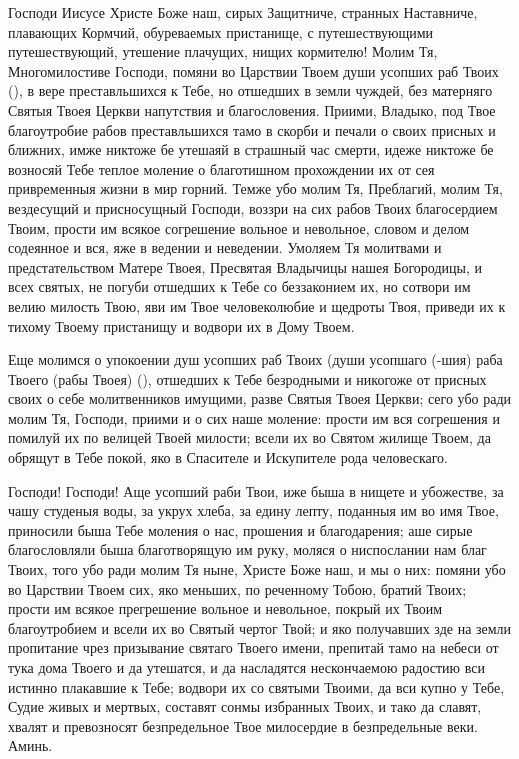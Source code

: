 \mychapterending

\begin{mymulticols}
 

Господи Иисусе Христе Боже наш, сирых Защитниче, странных Наставниче, плавающих Кормчий, обуреваемых пристанище, с путешествующими путешествующий, утешение плачущих, нищих кормителю! Молим Тя, Многомилостиве Господи, помяни во Царствии Твоем души усопших раб Твоих (), в вере преставльшихся к Тебе, но отшедших в земли чуждей, без матерняго Святыя Твоея Церкви напутствия и благословения. Приими, Владыко, под Твое благоутробие рабов преставльшихся тамо в скорби и печали о своих присных и ближних, имже никтоже бе утешаяй в страшный час смерти, идеже никтоже бе возносяй Тебе теплое моление о благотишном прохождении их от сея привременныя жизни в мир горний. Темже убо молим Тя, Преблагий, молим Тя, вездесущий и присносущный Господи, воззри на сих рабов Твоих благосердием Твоим, прости им всякое согрешение вольное и невольное, словом и делом содеянное и вся, яже в ведении и неведении. Умоляем Тя молитвами и предстательством Матере Твоея, Пресвятая Владычицы нашея Богородицы, и всех святых, не погуби отшедших к Тебе со беззаконием их, но сотвори им велию милость Твою, яви им Твое человеколюбие и щедроты Твоя, приведи их к тихому Твоему пристанищу и водвори их в Дому Твоем. 

Еще молимся о упокоении душ усопших раб Твоих (души усопшаго (-шия) раба Твоего (рабы Твоея) (), отшедших к Тебе безродными и никогоже от присных своих о себе молитвенников имущими, разве Святыя Твоея Церкви; сего убо ради молим Тя, Господи, приими и о сих наше моление: прости им вся согрешения и помилуй их по велицей Твоей милости; всели их во Святом жилище Твоем, да обрящут в Тебе покой, яко в Спасителе и Искупителе рода человескаго. 

Господи! Господи! Аще усопший раби Твои, иже быша в нищете и убожестве, за чашу студеныя воды, за укрух хлеба, за едину лепту, поданныя им во имя Твое, приносили быша Тебе моления о нас, прошения и благодарения; аше сирые благословляли быша благотворящую им руку, моляся о ниспослании нам благ Твоих, того убо ради молим Тя ныне, Христе Боже наш, и мы о них: помяни убо во Царствии Твоем сих, яко меньших, по реченному Тобою, братий Твоих; прости им всякое прегрешение вольное и невольное, покрый их Твоим благоутробием и всели их во Святый чертог Твой; и яко получавших зде на земли пропитание чрез призывание святаго Твоего имени, препитай тамо на небеси от тука дома Твоего и да утешатся, и да насладятся нескончаемою радостию вси истинно плакавшие к Тебе; водвори их со святыми Твоими, да вси купно у Тебе, Судие живых и мертвых, составят сонмы избранных Твоих, и тако да славят, хвалят и превозносят безпредельное Твое милосердие в безпредельные веки. Аминь. 

\end{mymulticols}

